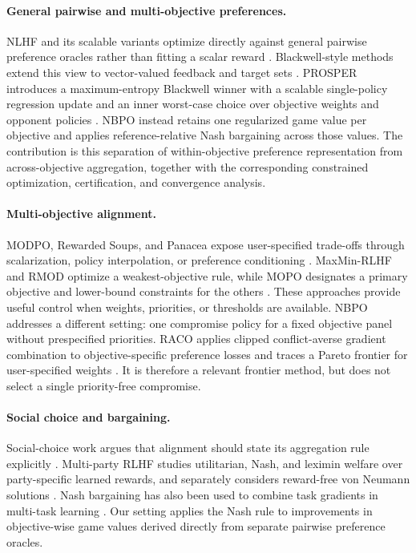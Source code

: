 \documentclass{article}
\theoremstyle{remark}
\theoremstyle{plain}
\newcommand{\NBPO}{\textsc{NBPO}}
\begin{document}
\paragraph{General pairwise and multi-objective preferences.}
NLHF and its scalable variants optimize directly against general pairwise preference oracles rather than fitting a scalar reward \citep{munos2024nash,wu2025sppo,zhang2025iterative,calandriello2024online,rosset2024direct,zhou2025egpo}. Blackwell-style methods extend this view to vector-valued feedback and target sets \citep{blackwell1956analog,bhatia2020multicriteria}. PROSPER introduces a maximum-entropy Blackwell winner with a scalable single-policy regression update and an inner worst-case choice over objective weights and opponent policies \citep{zhang2026prosper}. \NBPO{} instead retains one regularized game value per objective and applies reference-relative Nash bargaining across those values. The contribution is this separation of within-objective preference representation from across-objective aggregation, together with the corresponding constrained optimization, certification, and convergence analysis.

\paragraph{Multi-objective alignment.}
MODPO, Rewarded Soups, and Panacea expose user-specified trade-offs through scalarization, policy interpolation, or preference conditioning \citep{zhou2024beyond,rame2023rewarded,zhong2024panacea}. MaxMin-RLHF and RMOD optimize a weakest-objective rule, while MOPO designates a primary objective and lower-bound constraints for the others \citep{chakraborty2024maxmin,son2026rmod,agnihotri2026mopo}. These approaches provide useful control when weights, priorities, or thresholds are available. \NBPO{} addresses a different setting: one compromise policy for a fixed objective panel without prespecified priorities.
RACO applies clipped conflict-averse gradient combination to objective-specific preference losses and traces a Pareto frontier for user-specified weights \citep{chen2026raco}. It is therefore a relevant frontier method, but does not select a single priority-free compromise.

\paragraph{Social choice and bargaining.}
Social-choice work argues that alignment should state its aggregation rule explicitly \citep{conitzer2024social}. Multi-party RLHF studies utilitarian, Nash, and leximin welfare over party-specific learned rewards, and separately considers reward-free von Neumann solutions \citep{zhong2024nashwelfare}. Nash bargaining has also been used to combine task gradients in multi-task learning \citep{navon2022nashmtl}. Our setting applies the Nash rule to improvements in objective-wise game values derived directly from separate pairwise preference oracles.
\end{document}
